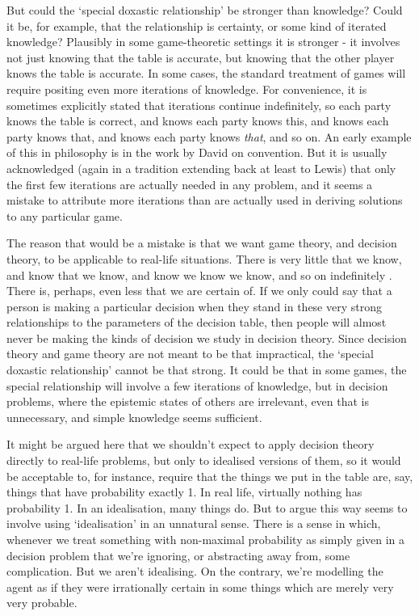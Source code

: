\documentclass[11pt,]{book}
\begin{document}
But could the `special doxastic relationship' be stronger than knowledge? Could it be, for example, that the relationship is certainty, or some kind of iterated knowledge? Plausibly in some game-theoretic settings it is stronger - it involves not just knowing that the table is accurate, but knowing that the other player knows the table is accurate. In some cases, the standard treatment of games will require positing even more iterations of knowledge. For convenience, it is sometimes explicitly stated that iterations continue indefinitely, so each party knows the table is correct, and knows each party knows this, and knows each party knows that, and knows each party knows \emph{that}, and so on. An early example of this in philosophy is in the work by David \citet{Lewis1969a} on convention. But it is usually acknowledged (again in a tradition extending back at least to Lewis) that only the first few iterations are actually needed in any problem, and it seems a mistake to attribute more iterations than are actually used in deriving solutions to any particular game.

The reason that would be a mistake is that we want game theory, and decision theory, to be applicable to real-life situations. There is very little that we know, and know that we know, and know we know we know, and so on indefinitely \citep[Ch. 4]{Williamson2000}. There is, perhaps, even less that we are certain of. If we only could say that a person is making a particular decision when they stand in these very strong relationships to the parameters of the decision table, then people will almost never be making the kinds of decision we study in decision theory. Since decision theory and game theory are not meant to be that impractical, the `special doxastic relationship' cannot be that strong. It could be that in some games, the special relationship will involve a few iterations of knowledge, but in decision problems, where the epistemic states of others are irrelevant, even that is unnecessary, and simple knowledge seems sufficient.

It might be argued here that we shouldn't expect to apply decision theory directly to real-life problems, but only to idealised versions of them, so it would be acceptable to, for instance, require that the things we put in the table are, say, things that have probability exactly 1. In real life, virtually nothing has probability 1. In an idealisation, many things do. But to argue this way seems to involve using `idealisation' in an unnatural sense. There is a sense in which, whenever we treat something with non-maximal probability as simply given in a decision problem that we're ignoring, or abstracting away from, some complication. But we aren't idealising. On the contrary, we're modelling the agent as if they were irrationally certain in some things which are merely very very probable.
\end{document}
